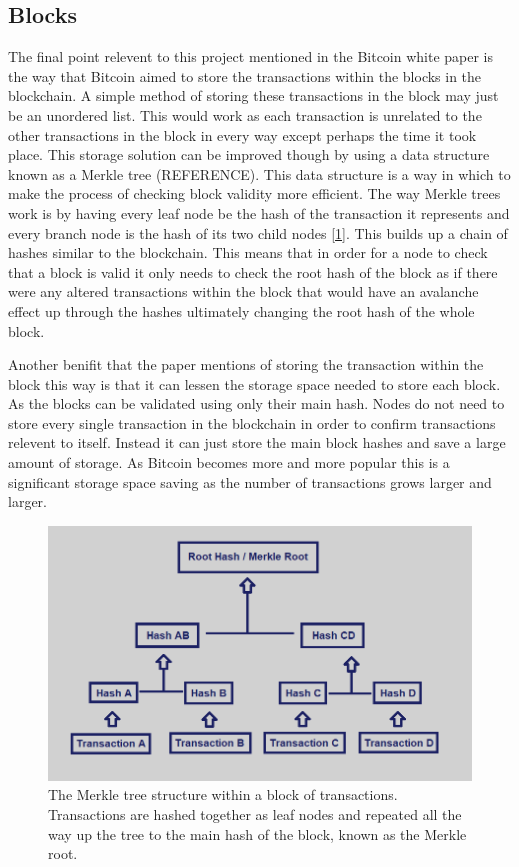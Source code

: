 \documentclass{l4proj}
\begin{document}
\subsection{Blocks}
The final point relevent to this project mentioned in the Bitcoin white paper is the way that Bitcoin aimed to store
the transactions within the blocks in the blockchain. A simple method of storing these transactions in the block may
just be an unordered list. This would work as each transaction is unrelated to the other transactions in the block in
every way except perhaps the time it took place. This storage solution can be improved though by using a data structure
known as a Merkle tree (REFERENCE). This data structure is a way in which to make the process of checking block validity
more efficient. The way Merkle trees work is by having every leaf node be the hash of the transaction it represents 
and every branch node is the hash of its two child nodes [\ref{fig:merkle}]. This builds up a chain of hashes similar to the blockchain.
This means that in order for a node to check that a block is valid it only needs to check the root hash of the block as
if there were any altered transactions within the block that would have an avalanche effect up through the hashes
ultimately changing the root hash of the whole block.

Another benifit that the paper mentions of storing the transaction within the block this way is that it can lessen
the storage space needed to store each block. As the blocks can be validated using only their main hash. Nodes do 
not need to store every single transaction in the blockchain in order to confirm transactions relevent to itself.
Instead it can just store the main block hashes and save a large amount of storage. As Bitcoin becomes more and
more popular this is a significant storage space saving as the number of transactions grows larger and larger.

\begin{figure}
    \centering
    \includegraphics[width=0.7\linewidth]{images/merkle-tree.png}    

    \caption{
        The Merkle tree structure within a block of transactions. Transactions are hashed together as leaf nodes
        and repeated all the way up the tree to the main hash of the block, known as the Merkle root.
    }

    \label{fig:merkle} 
\end{figure}
\end{document}

